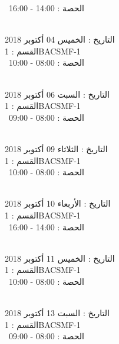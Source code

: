 \documentclass[14pt a4paper twocolumn]{book}
\begin{document}
 \  
الحصة : 14:00 - 16:00 \\
\par
\noindent\makebox[\linewidth]{\rule{\paperwidth}{0.4pt}}
 \\
التاريخ : الخميس 04 أكتوبر 2018 \\
القسم : 1BACSMF-1 \\
 \  
الحصة : 08:00 - 10:00 \\
\par
\noindent\makebox[\linewidth]{\rule{\paperwidth}{0.4pt}}
 \\
التاريخ : السبت 06 أكتوبر 2018 \\
القسم : 1BACSMF-1 \\
 \  
الحصة : 08:00 - 09:00 \\
\par
\noindent\makebox[\linewidth]{\rule{\paperwidth}{0.4pt}}
 \\
التاريخ : الثلاثاء 09 أكتوبر 2018 \\
القسم : 1BACSMF-1 \\
 \  
الحصة : 08:00 - 10:00 \\
\par
\noindent\makebox[\linewidth]{\rule{\paperwidth}{0.4pt}}
 \\
التاريخ : الأربعاء 10 أكتوبر 2018 \\
القسم : 1BACSMF-1 \\
 \  
الحصة : 14:00 - 16:00 \\
\par
\noindent\makebox[\linewidth]{\rule{\paperwidth}{0.4pt}}
 \\
التاريخ : الخميس 11 أكتوبر 2018 \\
القسم : 1BACSMF-1 \\
 \  
الحصة : 08:00 - 10:00 \\
\par
\noindent\makebox[\linewidth]{\rule{\paperwidth}{0.4pt}}
 \\
التاريخ : السبت 13 أكتوبر 2018 \\
القسم : 1BACSMF-1 \\
 \  
الحصة : 08:00 - 09:00 \\
\par
\noindent\makebox[\linewidth]{\rule{\paperwidth}{0.4pt}}
 \\
\end{document}
